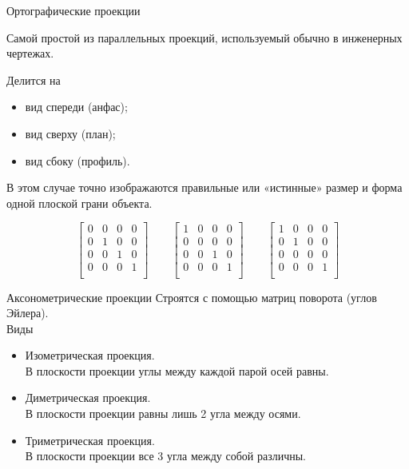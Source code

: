 \documentclass{beamer}
\begin{document}
	\begin{frame}{Ортографические проекции}
	
		Самой простой из параллельных проекций, используемый обычно в инженерных чертежах. 

		Делится на 
		\begin{itemize}
			\item вид спереди (анфас);
			\item вид сверху (план);
			\item вид сбоку (профиль).
		\end{itemize}
		
		В этом случае точно изображаются правильные или «истинные» размер и форма одной плоской грани объекта.

		\[
			\begin{bmatrix}
				0 & 0 & 0 & 0 \\
				0 & 1 & 0 & 0 \\
				0 & 0 & 1 & 0 \\
				0 & 0 & 0 & 1 \\
			 \end{bmatrix}	
			 \qquad
		 \begin{bmatrix}
			1 & 0 & 0 & 0 \\
			0 & 0 & 0 & 0 \\
			0 & 0 & 1 & 0 \\
			0 & 0 & 0 & 1 \\
		 \end{bmatrix}
		 \qquad
		 \begin{bmatrix}
			 1 & 0 & 0 & 0 \\
			 0 & 1 & 0 & 0 \\
			 0 & 0 & 0 & 0 \\
			 0 & 0 & 0 & 1 \\
		 \end{bmatrix}
	 \]

	
	\end{frame}

	\begin{frame}{Аксонометрические проекции}
		Строятся с помощью матриц поворота (углов Эйлера).
		\\ Виды
		\begin{itemize}
			\item Изометрическая проекция. \\
			В плоскости проекции углы между каждой парой осей равны.
			\item Диметрическая проекция. \\
			В плоскости проекции равны лишь 2 угла между осями.
			\item Триметрическая проекция. \\
			В плоскости проекции все 3 угла между собой различны.
		\end{itemize}
	\end{frame}
	
\end{document}
